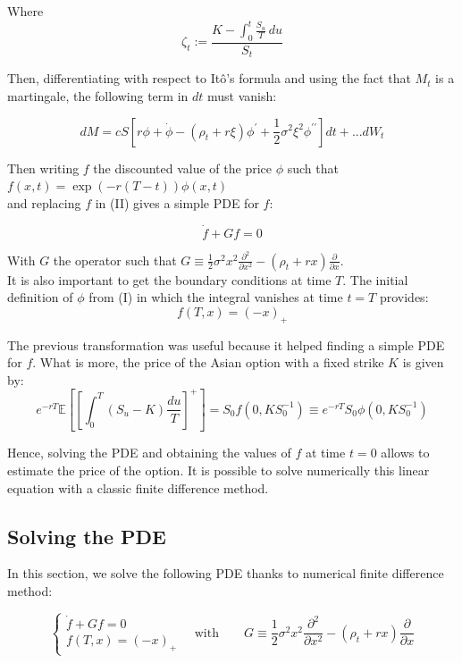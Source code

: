 \documentclass{article}
\begin{document}
Where
\[
	\zeta_{t} := \frac{K-\int_{0}^{t} \frac{S_{u}}{T}\,du}{S_{t}}
\]

Then, differentiating with respect to It\^o's formula and using the fact that $M_{t}$ is a martingale,
the following term in $dt$ must vanish:

\begin{equation}
	dM={c}{{S\left[r\phi+\dot{\phi}-\left(\rho_{t}+r\xi\right)\phi^{\prime}
	+\frac{1}{2}\sigma^{2}\xi^{2}\phi^{\prime\prime}\right]}}dt +...dW_t
	\tag{II}
\end{equation}

Then writing $f$ the discounted value of the price $\phi$ such that $f(x,t)=\exp(-r(T-t))\phi(x,t)$ \\
and replacing $f$ in (II) gives a simple PDE for $f$:

\begin{equation}
	\dot{f} + Gf=0
	\tag{PDE}
\end{equation}

With $G$ the operator such that
$G\equiv\frac{1}{2}\sigma^{2}x^{2}\frac{\partial^{2}}{\partial x^{2}}-(\rho_{t}+r x)\frac{\partial}{\partial x}$.
\\

It is also important to get the boundary conditions at time $T$. The initial definition of $\phi$ from (I)
in which the integral vanishes at time $t=T$ provides:
\[
	f(T,x)=(-x)_{+} 
\]

The previous transformation was useful because it helped finding a simple PDE for $f$.
What is more, the price of the Asian option with a fixed strike $K$ is given by:
\[
 	e^{-r T} \mathbb E \left[ \left[ \int_{0}^{T} \left( S_{u}-K \right) \frac{du}{T} \right]^{+} \right]
	=S_{0} f \left( 0, K S_{0}^{-1} \right) \equiv e^{-r T} S_{0} \phi \left( 0, K S_{0}^{-1} \right)
\]

Hence, solving the PDE and obtaining the values of $f$ at time $t=0$ allows to estimate the price of the option.
It is possible to solve numerically this linear equation with a classic finite difference method. 

\subsection{Solving the PDE}

In this section, we solve the following PDE thanks to numerical finite difference method:

\[
	\begin{cases}
		\dot{f} + Gf = 0 \\
		f(T,x)=(-x)_{+}
	\end{cases}
	\quad \text{with} \qquad
	G \equiv \frac{1}{2}\sigma^{2}x^{2}\frac{\partial^{2}}{\partial x^{2}}-(\rho_{t}+r x)\frac{\partial}{\partial x}
\]
\end{document}

